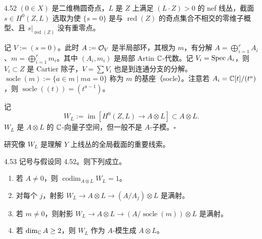 \begin{notation}{4.52}
$(0\in X)$ 是二维椭圆奇点，$L$ 是 $Z$ 上满足 $(L\cdot Z)>0$ 的 nef 线丛，截面 $s\in H^0(Z,L)$ 选取为使 $\{s=0\}$ 是与 $\operatorname{red}(Z)$ 的奇点集合不相交的零维子概型、且 $s|_{\operatorname{red}(Z)}$ 没有重零点。

记 $V:=(s=0)$。此时 $A:=\mathcal{O}_V$ 是半局部环，其根为 $m$，有分解 $A=\bigoplus_{i=1}^r A_i$、$m=\bigoplus_{i=1}^r m_i$。其中 $(A_i,m_i)$ 是局部 Artin $\mathbb{C}$-代数。记 $V_i=\operatorname{Spec} A_i$，则 $V_i\subset Z$ 是 Cartier 除子，$V=\sum V_i$ 也是到连通分支的分解。$\operatorname{socle}(m):=\{a\in m\mid ma=0\}$ 称为 $m$ 的基座（socle）。注意若 $A_i=\mathbb{C}[t]/(t^a)$，则 $\operatorname{socle}((t))=(t^{a-1})$。

记
\[ W_L:=\operatorname{im}[H^0(Z,L)\to A\otimes L]\subset A\otimes L. \]
$W_L$ 是 $A\otimes L$ 的 $\mathbb{C}$-向量子空间，但一般不是 $A$-子模。\hfill$\square$
\end{notation}

研究像 $W_L$ 是理解 $Y$ 上线丛的全局截面的重要线索。

\begin{lemmap}{4.53}
记号与假设同 4.52。则下列成立。
\begin{enumerate}[label=(\arabic*),leftmargin=2.4em,itemsep=1pt,topsep=2pt]
\item 若 $A\neq 0$，则 $\operatorname{codim}_{A\otimes L}W_L=1$。
\item 对每个 $j$，射影 $W_L\to A\otimes L\to(A/A_j)\otimes L$ 是满射。
\item 若 $m\neq 0$，则射影 $W_L\to A\otimes L\to(A/\operatorname{socle}(m))\otimes L$ 是满射。
\item 若 $\dim_{\mathbb{C}}A\ge 2$，则 $W_L$ 作为 $A$-模生成 $A\otimes L$。
\end{enumerate}
\end{lemmap}

